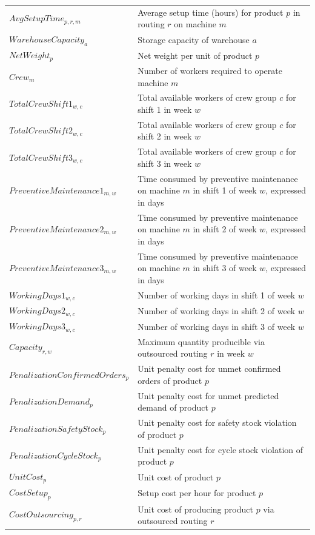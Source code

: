 \documentclass{article}
\begin{document}
\begin{longtable}{l p{8cm}}
$AvgSetupTime_{p,r,m}$ & Average setup time (hours) for product $p$ in routing $r$ on machine $m$ \\
$WarehouseCapacity_a$ & Storage capacity of warehouse $a$ \\
$NetWeight_p$ & Net weight per unit of product $p$ \\
$Crew_m$ & Number of workers required to operate machine $m$ \\
$TotalCrewShift1_{w,c}$ & Total available workers of crew group $c$ for shift 1 in week $w$ \\
$TotalCrewShift2_{w,c}$ & Total available workers of crew group $c$ for shift 2 in week $w$ \\
$TotalCrewShift3_{w,c}$ & Total available workers of crew group $c$ for shift 3 in week $w$ \\
$PreventiveMaintenance1_{m,w}$ & Time consumed by preventive maintenance on machine $m$ in shift 1 of week $w$, expressed in days \\
$PreventiveMaintenance2_{m,w}$ & Time consumed by preventive maintenance on machine $m$ in shift 2 of week $w$, expressed in days \\
$PreventiveMaintenance3_{m,w}$ & Time consumed by preventive maintenance on machine $m$ in shift 3 of week $w$, expressed in days \\
$WorkingDays1_{w,c}$ & Number of working days in shift 1 of week $w$ \\
$WorkingDays2_{w,c}$ & Number of working days in shift 2 of week $w$ \\
$WorkingDays3_{w,c}$ & Number of working days in shift 3 of week $w$ \\
$Capacity_{r,w}$ & Maximum quantity producible via outsourced routing $r$ in week $w$ \\
$PenalizationConfirmedOrders_p$ & Unit penalty cost for unmet confirmed orders of product $p$ \\
$PenalizationDemand_p$ & Unit penalty cost for unmet predicted demand of product $p$ \\
$PenalizationSafetyStock_p$ & Unit penalty cost for safety stock violation of product $p$ \\
$PenalizationCycleStock_p$ & Unit penalty cost for cycle stock violation of product $p$ \\
$UnitCost_p$ &  Unit cost of product $p$ \\
$CostSetup_p$ & Setup cost per hour for product $p$ \\
$CostOutsourcing_{p,r}$ & Unit cost of producing product $p$ via outsourced routing $r$ \\

\end{longtable}
\end{document}
